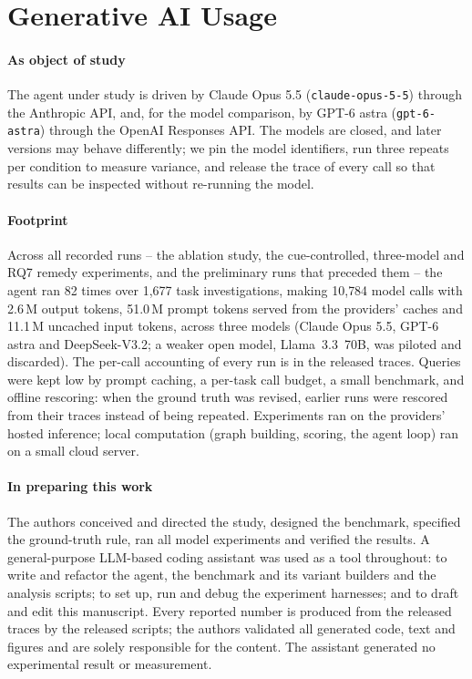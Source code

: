 \section{Generative AI Usage}
\label{sec:genai}
\paragraph{As object of study} The agent under study is driven by Claude Opus 5.5 (\texttt{claude-opus-5-5})
through the Anthropic API, and, for the model comparison, by GPT-6 astra (\texttt{gpt-6-astra}) through the
OpenAI Responses API. The models are closed, and later versions may behave differently; we pin the model
identifiers, run three repeats per condition to measure variance, and release the trace of every call so that
results can be inspected without re-running the model.

\paragraph{Footprint} Across all recorded runs -- the ablation study, the cue-controlled, three-model and RQ7
remedy experiments, and the preliminary runs that preceded them -- the agent ran 82 times over 1{,}677 task
investigations, making 10{,}784 model calls with 2.6\,M output tokens, 51.0\,M prompt tokens served from the
providers' caches and 11.1\,M uncached input tokens, across three models (Claude Opus 5.5, GPT-6 astra and
DeepSeek-V3.2; a weaker open model, Llama~3.3~70B, was piloted and discarded). The per-call accounting of every
run is in the released traces. Queries were kept low by prompt caching, a per-task call budget, a small
benchmark, and offline rescoring: when the ground truth was revised, earlier runs were rescored from their traces
instead of being repeated. Experiments ran on the providers' hosted inference; local computation (graph building,
scoring, the agent loop) ran on a small cloud server.

\paragraph{In preparing this work} %
The authors conceived and directed the study, designed the benchmark, specified the ground-truth rule, ran all
model experiments and verified the results. A general-purpose LLM-based coding assistant was used as a tool
throughout: to write and refactor the agent, the benchmark and its variant builders and the analysis scripts;
to set up, run and debug the experiment harnesses; and to draft and edit this manuscript. Every reported number
is produced from the released traces by the released scripts; the authors validated all generated code, text and
figures and are solely responsible for the content. The assistant generated no experimental result or
measurement.
